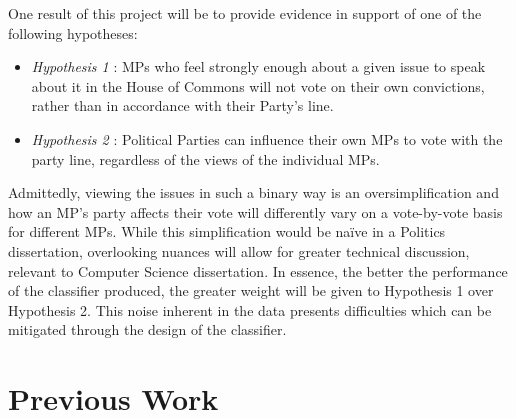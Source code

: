 \documentclass[12pt,a4paper,twoside,openright]{report}
\begin{document}
\newline
\newline
One result of this project will be to provide evidence in support of one of the following hypotheses:
\begin{itemize}
	\item \emph{Hypothesis 1} \label{hypothesis_one}: MPs who feel strongly enough about a given issue to speak about it in the House of Commons will not vote on their own convictions, rather than in accordance with their Party's line.
	\item \emph{Hypothesis 2} \label{hypothesis_two}: Political Parties can influence their own MPs to vote with the party line, regardless of the views of the individual MPs.
\end{itemize}

Admittedly, viewing the issues in such a binary way is an oversimplification and how an MP's party affects their vote will differently vary on a vote-by-vote basis for different MPs. While this simplification would be naïve in a Politics dissertation, overlooking nuances will allow for greater technical discussion, relevant to Computer Science dissertation. In essence, the better the performance of the classifier produced, the greater weight will be given to Hypothesis 1 over Hypothesis 2. This noise inherent in the data presents difficulties which can be mitigated through the design of the classifier.

\section{Previous Work} \label{intro-prevwork}
\end{document}

